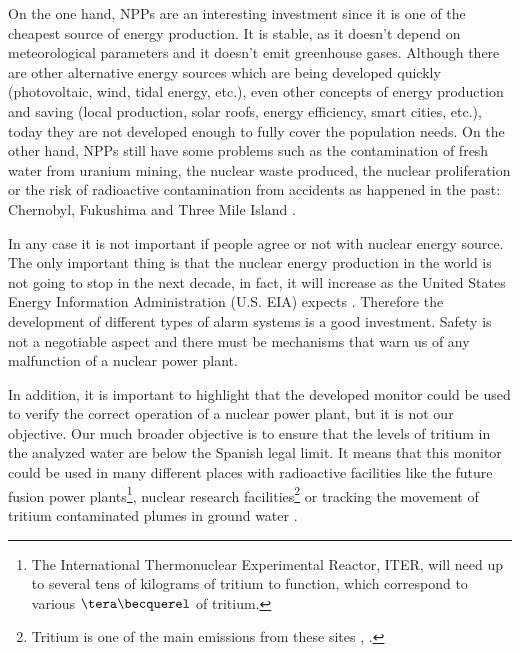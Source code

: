 On the one hand, NPPs are an interesting investment since it is one of the cheapest source of energy production. It is stable, as it doesn't depend on  meteorological parameters and it doesn't emit greenhouse gases. Although there are other alternative energy sources which are being developed quickly  (photovoltaic, wind, tidal energy, etc.), even other concepts of energy production and saving (local production, solar roofs, energy efficiency, smart cities, etc.), today they are not developed enough to fully cover the population needs. On the other hand, NPPs still have some problems such as the contamination of fresh water from uranium mining, the nuclear waste produced, the nuclear proliferation or the risk of radioactive contamination from accidents as happened in the past: Chernobyl, Fukushima and Three Mile Island \cite{ThreeMileIsland}.

In any case it is not important if people agree or not with nuclear energy source. The only important thing is that the nuclear energy production in the world is not going to stop in the next decade, in fact, it will increase as the United States Energy Information Administration (U.S. EIA) expects \cite{EIAOutlook}. Therefore the development of  different types of alarm systems is a good investment. Safety is not a negotiable aspect and there must be mechanisms that warn us of any malfunction of a nuclear power plant. 

In addition, it is important to highlight that the developed monitor could be used to verify the correct operation of a nuclear power plant, but it is not our objective. Our much broader objective is to ensure that the levels of tritium in the analyzed water are below the Spanish legal limit. It means that this monitor could be used in many different places with radioactive facilities like the future fusion power plants\footnote{The International Thermonuclear Experimental Reactor, ITER, will need up to several tens of kilograms of tritium to function, which correspond to various $\tera\becquerel$ of tritium.}, nuclear research facilities\footnote{Tritium is one of the main emissions from these sites \cite{FERMILAB}, \cite{BrookHavenNationalLaboratory}.} or tracking the movement of tritium contaminated plumes in ground water \cite{TrackingTritium}. 

